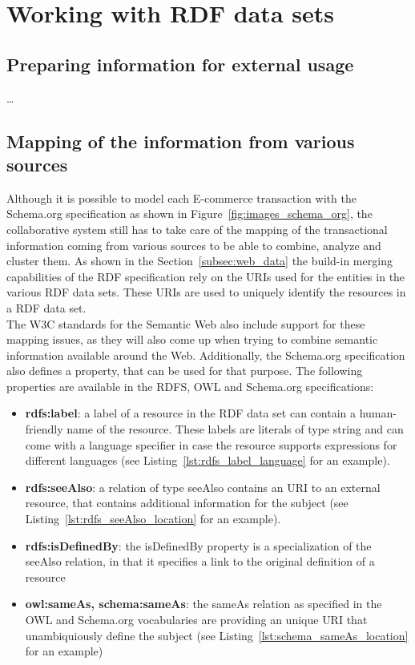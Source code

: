 
\section{Working with \gls{RDF} data sets}
\label{sec:working_semantic_data}

\subsection{Preparing information for external usage}
\label{subsec:prepare_information}

\ldots

\subsection{Mapping of the information from various sources}
\label{subsec:information_mapping}

Although it is possible to model each \gls{E-commerce} transaction with the Schema.org specification as shown in Figure~\ref{fig:images_schema_org}, the collaborative system still has to take care of the mapping of the transactional information coming from various sources to be able to combine, analyze and cluster them. As shown in the Section~\ref{subsec:web_data} the build-in merging capabilities of the \gls{RDF} specification rely on the \gls{URI}s used for the entities in the various \gls{RDF} data sets. These \gls{URI}s are used to uniquely identify the resources in a \gls{RDF} data set. \\

The \gls{W3C} standards for the Semantic Web also include support for these mapping issues, as they will also come up when trying to combine semantic information available around the Web. Additionally, the Schema.org specification also defines a property, that can be used for that purpose. The following properties are available in the \gls{RDFS}, \gls{OWL} and Schema.org specifications: \@

\begin{itemize}
	\item \textbf{rdfs:label}: a label of a resource in the \gls{RDF} data set can contain a human-friendly name of the resource. These labels are literals of type string and can come with a language specifier in case the resource supports expressions for different languages (see Listing~\ref{lst:rdfs_label_language} for an example).
	\item \textbf{rdfs:seeAlso}: a relation of type seeAlso contains an \gls{URI} to an external resource, that contains additional information for the subject (see Listing~\ref{lst:rdfs_seeAlso_location} for an example).
	\item \textbf{rdfs:isDefinedBy}: the isDefinedBy property is a specialization of the seeAlso relation, in that it specifies a link to the original definition of a resource
	\item \textbf{owl:sameAs, schema:sameAs}: the sameAs relation as specified in the \gls{OWL} and Schema.org vocabularies are providing an unique \gls{URI} that unambiquiously define the subject (see Listing~\ref{lst:schema_sameAs_location} for an example)
\end{itemize}

